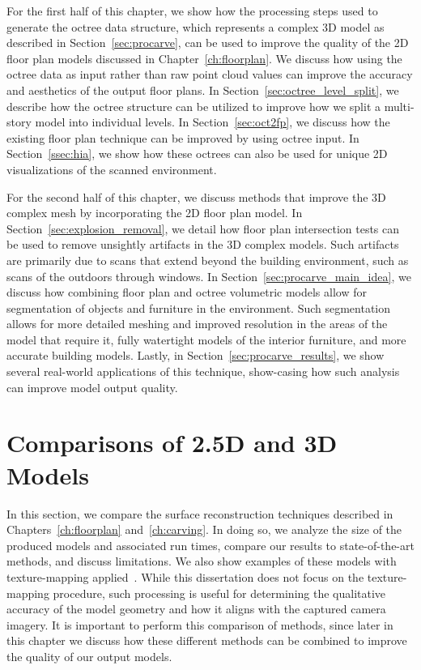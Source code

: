 \documentclass[12pt,onecolumn,oneside]{book}
\begin{document}
For the first half of this chapter, we show how the processing steps used to generate the octree data structure, which represents a complex 3D model as described in Section~\ref{sec:procarve}, can be used to improve the quality of the 2D floor plan models discussed in Chapter~\ref{ch:floorplan}.  We discuss how using the octree data as input rather than raw point cloud values can improve the accuracy and aesthetics of the output floor plans.  In Section~\ref{sec:octree_level_split}, we describe how the octree structure can be utilized to improve how we split a multi-story model into individual levels.  In Section~\ref{sec:oct2fp}, we discuss how the existing floor plan technique can be improved by using octree input.  In Section~\ref{ssec:hia}, we show how these octrees can also be used for unique 2D visualizations of the scanned environment.

For the second half of this chapter, we discuss methods that improve the 3D complex mesh by incorporating the 2D floor plan model.  In Section~\ref{sec:explosion_removal}, we detail how floor plan intersection tests can be used to remove unsightly artifacts in the 3D complex models.  Such artifacts are primarily due to scans that extend beyond the building environment, such as scans of the outdoors through windows.  In Section~\ref{sec:procarve_main_idea}, we discuss how combining floor plan and octree volumetric models allow for segmentation of objects and furniture in the environment.  Such segmentation allows for more detailed meshing and improved resolution in the areas of the model that require it, fully watertight models of the interior furniture, and more accurate building models.  Lastly, in Section~\ref{sec:procarve_results}, we show several real-world applications of this technique, show-casing how such analysis can improve model output quality.

\section{Comparisons of 2.5D and 3D Models}
\label{sec:fp_carving_compare}

In this section, we compare the surface reconstruction techniques described in Chapters~\ref{ch:floorplan} and~\ref{ch:carving}.  In doing so, we analyze the size of the produced models and associated run times, compare our results to state-of-the-art methods, and discuss limitations.  We also show examples of these models with texture-mapping applied~\cite{Cheng14,Turner14Journal}.  While this dissertation does not focus on the texture-mapping procedure, such processing is useful for determining the qualitative accuracy of the model geometry and how it aligns with the captured camera imagery.  It is important to perform this comparison of methods, since later in this chapter we discuss how these different methods can be combined to improve the quality of our output models.
\end{document}
